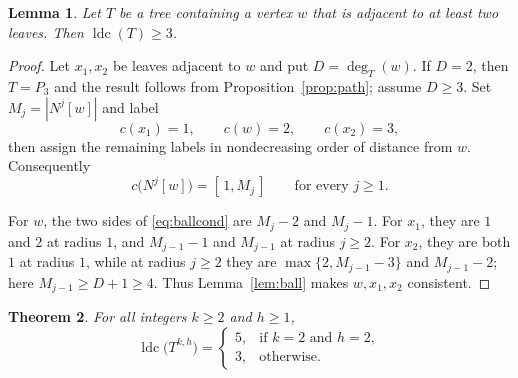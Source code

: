 \documentclass[reqno,10pt]{article}
\newtheorem{theorem}{Theorem}
\newtheorem{lemma}[theorem]{Lemma}
\theoremstyle{definition}
\numberwithin{equation}{section}
\numberwithin{theorem}{section}
\newcommand{\ldc}{\operatorname{ldc}}
\newcommand{\Ball}[2]{N^{#2}[#1]}
\newcommand{\Tkh}{T^{k,h}}
\begin{document}
\begin{lemma}
\label{lem:twoleaves}
Let $T$ be a tree containing a vertex $w$ that is adjacent to at least two
leaves. Then $\ldc(T)\ge3$.
\end{lemma}

\begin{proof}
Let $x_1,x_2$ be leaves adjacent to $w$ and put $D=\deg_T(w)$. If $D=2$,
then $T=P_3$ and the result follows from Proposition~\ref{prop:path}; assume
$D\ge3$. Set $M_j=|\Ball{w}{j}|$ and label
\[
  c(x_1)=1,\qquad c(w)=2,\qquad c(x_2)=3,
\]
then assign the remaining labels in nondecreasing order of distance from $w$.
Consequently
\[
  c\bigl(\Ball{w}{j}\bigr)=[\,1,M_j\,]\qquad\text{for every } j\ge1 .
\]

For $w$, the two sides of \eqref{eq:ballcond} are $M_j-2$ and $M_j-1$.
For $x_1$, they are $1$ and $2$ at radius $1$, and $M_{j-1}-1$ and
$M_{j-1}$ at radius $j\ge2$. For $x_2$, they are both $1$ at radius $1$,
while at radius $j\ge2$ they are
$\max\{2,M_{j-1}-3\}$ and $M_{j-1}-2$; here $M_{j-1}\ge D+1\ge4$.
Thus Lemma~\ref{lem:ball} makes $w,x_1,x_2$ consistent.
\end{proof}

\begin{theorem}
\label{thm:kary}
For all integers $k\ge2$ and $h\ge1$,
\[
  \ldc\bigl(\Tkh\bigr)=
  \begin{cases}
    5, & \text{if } k=2 \text{ and } h=2,\\[2pt]
    3, & \text{otherwise.}
  \end{cases}
\]
\end{theorem}
\end{document}
